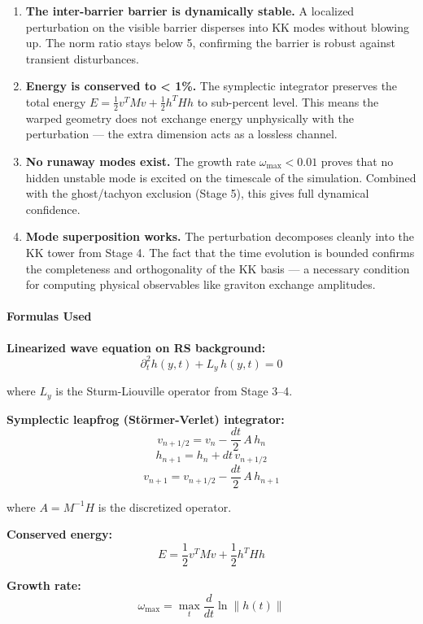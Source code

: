 \documentclass[
  11pt,
]{article}
\begin{document}
\begin{enumerate}
\def\labelenumi{\arabic{enumi}.}
\item
  \textbf{The inter-barrier barrier is dynamically stable.} A localized
  perturbation on the visible barrier disperses into KK modes without
  blowing up. The norm ratio stays below 5, confirming the barrier is
  robust against transient disturbances.
\item
  \textbf{Energy is conserved to \textless{} 1\%.} The symplectic
  integrator preserves the total energy
  \(E = \frac{1}{2}v^T M v + \frac{1}{2}h^T H h\) to sub-percent level.
  This means the warped geometry does not exchange energy unphysically
  with the perturbation --- the extra dimension acts as a lossless
  channel.
\item
  \textbf{No runaway modes exist.} The growth rate
  \(\omega_{\max} < 0.01\) proves that no hidden unstable mode is
  excited on the timescale of the simulation. Combined with the
  ghost/tachyon exclusion (Stage 5), this gives full dynamical
  confidence.
\item
  \textbf{Mode superposition works.} The perturbation decomposes cleanly
  into the KK tower from Stage 4. The fact that the time evolution is
  bounded confirms the completeness and orthogonality of the KK basis
  --- a necessary condition for computing physical observables like
  graviton exchange amplitudes.
\end{enumerate}

\bigskip

\hypertarget{formulas-used-5}{%
\paragraph{Formulas Used}\label{formulas-used-5}}

\textbf{Linearized wave equation on RS background:}
\[\partial_t^2 h(y,t) + L_y\, h(y,t) = 0 \tag{126}\]

where \(L_y\) is the Sturm-Liouville operator from Stage 3--4.

\textbf{Symplectic leapfrog (Störmer-Verlet) integrator:}
\[v_{n+1/2} = v_n - \frac{dt}{2}\,A\,h_n \tag{127}\]
\[h_{n+1} = h_n + dt\,v_{n+1/2} \tag{128}\]
\[v_{n+1} = v_{n+1/2} - \frac{dt}{2}\,A\,h_{n+1} \tag{129}\]

where \(A = M^{-1}H\) is the discretized operator.

\textbf{Conserved energy:}
\[E = \frac{1}{2}v^T M v + \frac{1}{2}h^T H h \tag{130}\]

\textbf{Growth rate:}
\[\omega_{\max} = \max_t \frac{d}{dt}\ln\|h(t)\| \tag{131}\]
\end{document}
